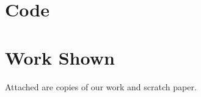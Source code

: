 \documentclass{article}
\begin{document}
\section*{Code}


\section*{Work Shown}
Attached are copies of our work and scratch paper.
\end{document}
